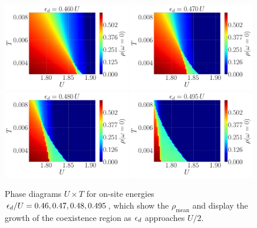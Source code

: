 \documentclass[12pt]{report}
\begin{document}
\begin{figure}[H]
\includegraphics[width=0.49\textwidth]{fig/dmft/coex_mean-df_0-mu=0.460.png}
\hfill
\includegraphics[width=0.49\textwidth]{fig/dmft/coex_mean-df_0-mu=0.470.png}
\includegraphics[width=0.49\textwidth]{fig/dmft/coex_mean-df_0-mu=0.480.png}
\hfill
\includegraphics[width=0.49\textwidth]{fig/dmft/coex_mean-df_0-mu=0.495.png}
\caption{Phase diagrams $U \times T$ for on-site energies $\epsilon_d/U = 0.46, 0.47, 0.48, 0.495$, which show the $\rho_{\text{mean}}$ and display the growth of the coexistence region as $\epsilon_d$ approaches $U/2$.}
\label{fig:Diagram_Drho_U_T_coex}
\end{figure}
\end{document}
